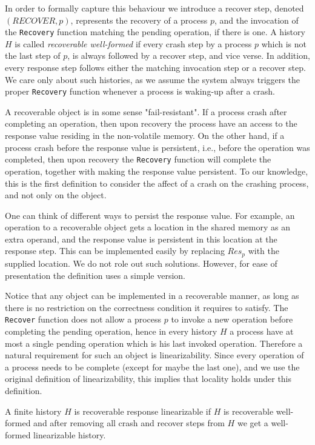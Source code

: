In order to formally capture this behaviour we introduce a recover step, denoted $(RECOVER,p)$, represents the recovery of a process $p$, and the invocation of the \texttt{Recovery} function matching the pending operation, if there is one.
A history $H$ is called \textit{recoverable well-formed} if every crash step by a process $p$ which is not the last step of $p$, is always followed by a recover step, and vice verse. In addition, every response step follows either the matching invocation step or a recover step. We care only about such histories, as we assume the system always triggers the proper \texttt{Recovery} function whenever a process is waking-up after a crash.


A recoverable object is in some sense "fail-resistant". If a process crash after completing an operation, then upon recovery the process have an access to the response value residing in the non-volatile memory. On the other hand, if a process crash before the response value is persistent, i.e., before the operation was completed, then upon recovery the \texttt{Recovery} function will complete the operation, together with making the response value persistent. To our knowledge, this is the first definition to consider the affect of a crash on the crashing process, and not only on the object.

One can think of different ways to persist the response value. For example, an operation to a recoverable object gets a location in the shared memory as an extra operand, and the response value is persistent in this location at the response step. This can be implemented easily by replacing $Res_p$ with the supplied location. We do not role out such solutions. However, for ease of presentation the definition uses a simple version.

Notice that any object can be implemented in a recoverable manner, as long as there is no restriction on the correctness condition it requires to satisfy. The \texttt{Recover} function does not allow a process $p$ to invoke a new operation before completing the pending operation, hence in every history $H$ a process have at most a single pending operation which is his last invoked operation. Therefore a natural requirement for such an object is linearizability. Since every operation of a process needs to be complete (except for maybe the last one), and we use the original definition of linearizability, this implies that locality holds under this definition.

\begin{definition} 
	\label{Definition: RR-linearizability}
	A finite history $H$ is recoverable response linearizable if $H$ is recoverable well-formed and after removing all crash and recover steps from $H$ we get a well-formed linearizable history.
\end{definition}


